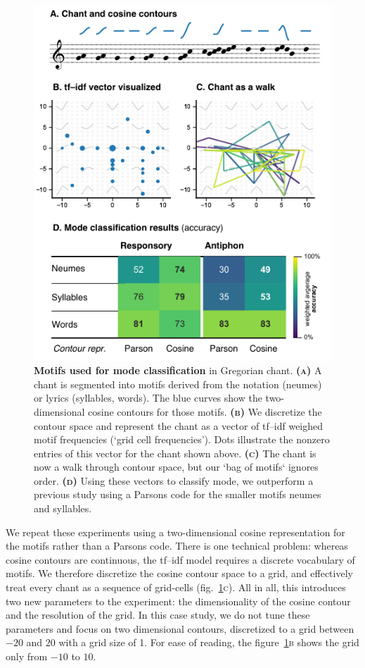 \documentclass{article}
\newcommand{\subfiglabel}[1]{\textbf{\textsc{#1}}}
\begin{document}
\begin{figure}[t]
    \centering
    \includegraphics{figs/fig06-mode-classification.pdf}
    \caption{
        \textbf{Motifs used for mode classification} in Gregorian chant. 
        \subfiglabel{(a)}
        A chant is segmented into motifs derived from the notation (neumes) or lyrics (syllables, words).
        The blue curves show the two-dimensional cosine contours for those motifs.
        \subfiglabel{(b)}
        We discretize the contour space and represent the chant as a vector of tf--idf weighed motif frequencies (`grid cell frequencies').
        Dots illustrate the nonzero entries of this vector for the chant shown above.
        \subfiglabel{(c)}
        The chant is now a walk through contour space, but our `bag of motifs` ignores order.
        \subfiglabel{(d)}
        Using these vectors to classify mode, we outperform a previous study using a Parsons code for the smaller motifs neumes and syllables.
        }
    \label{fig:chant}
\end{figure}


We repeat these experiments using a two-dimensional cosine representation for the motifs rather than a Parsons code.
There is one technical problem: whereas cosine contours are continuous, the tf--idf model requires a discrete vocabulary of motifs.
We therefore discretize the cosine contour space to a grid, and effectively treat every chant as a sequence of grid-cells (fig.~\ref{fig:chant}\textsc{c}).
All in all, this introduces two new parameters to the experiment: the dimensionality of the cosine contour and the resolution of the grid.
In this case study, we do not tune these parameters and focus on two dimensional contours, discretized to a grid between $-20$ and $20$ with a grid size of 1.
For ease of reading, the figure~\ref{fig:chant}\textsc{b} shows the grid only from $-10$ to $10$.
\end{document}
